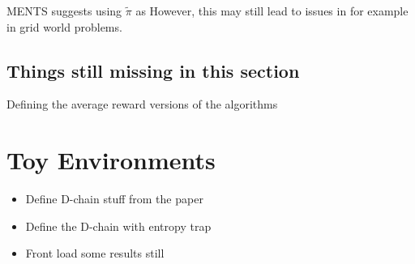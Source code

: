          MENTS suggests using $\tilde{\pi}$ as 
        However, this may still lead to issues in for example in grid world problems. 









    \subsection{Things still missing in this section}
        Defining the average reward versions of the algorithms








\section{Toy Environments}
\label{sec:4-3-toyenvs}

    \begin{itemize}
        \item Define D-chain stuff from the paper
        \item Define the D-chain with entropy trap
        \item Front load some results still
    \end{itemize}


     
